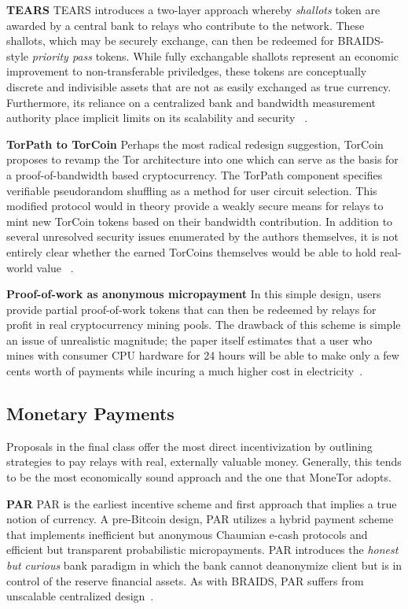 \textbf{TEARS} TEARS introduces a two-layer approach whereby \emph{shallots}
token are awarded by a central bank to relays who contribute to the
network. These shallots, which may be securely exchange, can then be redeemed
for BRAIDS-style \emph{priority pass} tokens. While fully exchangable shallots
represent an economic improvement to non-transferable priviledges, these tokens
are conceptually discrete and indivisible assets that are not as easily
exchanged as true currency. Furthermore, its reliance on a centralized bank and
bandwidth measurement authority place implicit limits on its scalability and
security ~\cite{jansen2010recruiting}.

\textbf{TorPath to TorCoin} Perhaps the most radical redesign suggestion,
TorCoin proposes to revamp the Tor architecture into one which can serve as the
basis for a proof-of-bandwidth based cryptocurrency. The TorPath component
specifies verifiable pseudorandom shuffling as a method for user circuit
selection. This modified protocol would in theory provide a weakly secure means
for relays to mint new TorCoin tokens based on their bandwidth contribution. In
addition to several unresolved security issues enumerated by the authors
themselves, it is not entirely clear whether the earned TorCoins themselves
would be able to hold real-world value ~\cite{ghosh2014torpath}.

\textbf{Proof-of-work as anonymous micropayment} In this simple design,
users provide partial proof-of-work tokens that can then be redeemed by relays
for profit in real cryptocurrency mining pools. The drawback of this scheme is
simple an issue of unrealistic magnitude; the paper itself estimates that a user
who mines with consumer CPU hardware for 24 hours will be able to make only a
few cents worth of payments while incuring a much higher cost in
electricity~\cite{biryukov2015proof}.

\subsection{Monetary Payments}

Proposals in the final class offer the most direct incentivization by outlining
strategies to pay relays with real, externally valuable money. Generally, this
tends to be the most economically sound approach and the one that MoneTor
adopts.

\textbf{PAR} PAR is the earliest incentive scheme and first approach that
implies a true notion of currency. A pre-Bitcoin design, PAR utilizes a hybrid
payment scheme that implements inefficient but anonymous Chaumian e-cash
protocols and efficient but transparent probabilistic micropayments. PAR
introduces the \emph{honest but curious} bank paradigm in which the bank cannot
deanonymize client but is in control of the reserve financial assets. As with
BRAIDS, PAR suffers from unscalable centralized design~\cite{androulaki2008payment}.

